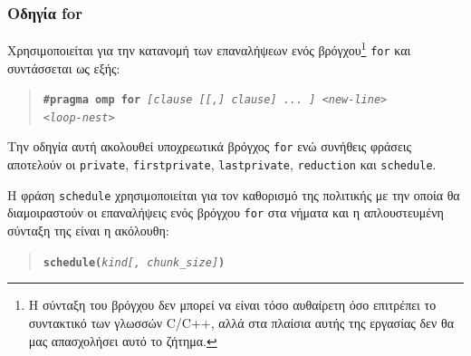 \subsubsection{Οδηγία for}
Χρησιμοποιείται για την κατανομή των επαναλήψεων ενός βρόγχου\footnote{Η σύνταξη του βρόγχου δεν μπορεί να είναι τόσο αυθαίρετη όσο επιτρέπει το συντακτικό των γλωσσών C/C++, αλλά στα πλαίσια αυτής της εργασίας δεν θα μας απασχολήσει αυτό το ζήτημα.} \texttt{for} και συντάσσεται ως εξής:
\begin{quote}
	\texttt{\textbf{\#pragma omp for} \textit{[clause [[,] clause] ... ] <new-line>}} \\
		\texttt{\textit{<loop-nest>}}
\end{quote}

Την οδηγία αυτή ακολουθεί υποχρεωτικά βρόγχος \texttt{for} ενώ συνήθεις φράσεις αποτελούν οι \texttt{private}, \texttt{firstprivate}, \texttt{lastprivate}, \texttt{reduction} και \texttt{schedule}.

Η φράση \texttt{schedule} χρησιμοποιείται για τον καθορισμό της πολιτικής με την οποία θα διαμοιραστούν οι επαναλήψεις ενός βρόγχου \texttt{for} στα νήματα και η απλουστευμένη σύνταξη της είναι η ακόλουθη:
\begin{quote}
	\texttt{\textbf{schedule(}\textit{kind[, chunk\_size]}\textbf{)}}
\end{quote}

